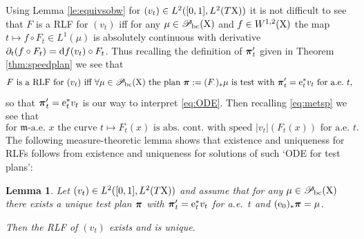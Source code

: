 \documentclass[11pt]{article}
\numberwithin{equation}{section}
\newtheorem{lemma}[theorem]{Lemma}
\newcommand{\ppi}{{\mbox{\boldmath$\pi$}}}
\newcommand{\pr}{\mathscr P}
\newcommand{\e}{{\rm e}}
\newcommand{\X}{{\rm X}}
\newcommand{\mm}{{\mathfrak m}}
\renewcommand{\d}{{\rm d}}
\newcommand{\bc}{{\rm bc}}
\begin{document}
Using Lemma  \ref{le:equivsobw}  for  $(v_t)\in L^2([0,1],L^2(T\X))$ it is not difficult to see that $F$ is a RLF for $(v_t)$ iff  for any $\mu\in\pr_\bc(\X)$ and $f\in W^{1,2}(\X)$ the map $t\mapsto f\circ F_t\in L^1(\mu)$ is absolutely continuous with derivative $\partial_t(f\circ F_t)=\d f(v_t)\circ F_t$. Thus recalling the definition of $\ppi'_t$ given in Theorem \ref{thm:speedplan} we see that
\[
\begin{split}
\text{$F$ is a RLF for $(v_t)$ iff $\forall\mu\in\pr_\bc(\X)$ the plan $\ppi:=(F_\cdot)_*\mu$ is  test with $\ppi'_t=\e_t^*v_t$ for a.e.\ $t$,}
\end{split}
\]
so that $\ppi'_t=\e_t^*v_t$ is our way to interpret \eqref{eq:ODE}. Then recalling \eqref{eq:metsp} we see that 
\begin{equation}
\label{eq:speedrlf}
\text{for $\mm$-a.e.\ $x$ the curve $t\mapsto F_t(x)$ is abs.\ cont.\ with speed  $|v_t|(F_t(x))$ for a.e.\ $t$.}
\end{equation}
The following measure-theoretic lemma shows that existence and uniqueness for RLFs follows from existence and uniqueness for solutions of such `ODE for test plans':
\begin{lemma}\label{le:measth}
Let $(v_t)\in L^2([0,1],L^2(T\X))$ and assume that for any $\mu\in\pr_\bc(\X)$ there exists a unique test plan $\ppi$ with $\ppi'_t=\e_t^*v_t$ for a.e.\ $t$ and $(\e_0)_*\ppi=\mu$.

 Then the RLF of $(v_t)$ exists and is unique.
  \end{lemma}
\end{document}
